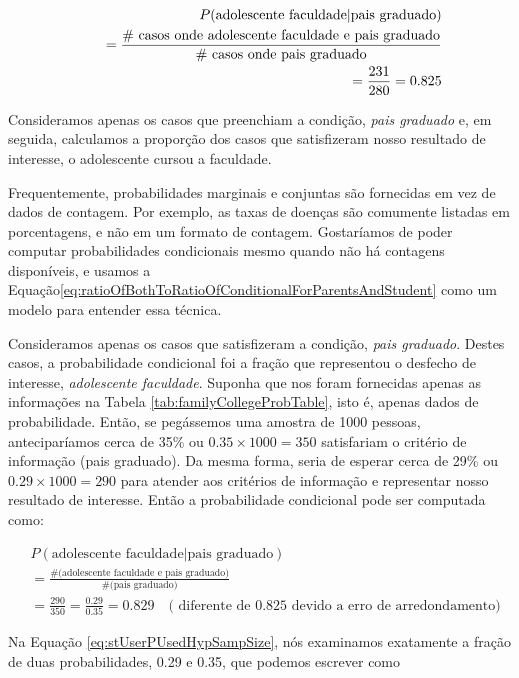 \documentclass[
]{book}
\theoremstyle{definition}
\theoremstyle{definition}
\theoremstyle{definition}
\theoremstyle{definition}
\theoremstyle{remark}
\begin{document}
\begin{eqnarray}
&& P(\text{adolescente faculdade} | \text{pais graduado}) \\
&&\quad = \frac{\text{\# casos onde adolescente faculdade e pais graduado}}{\text{\# casos onde pais graduado}} \\
&&\quad = \frac{231}{280} = 0.825 \notag
\label{eq:ratioOfBothToRatioOfConditionalForParentsAndStudent}
\end{eqnarray}

Consideramos apenas os casos que preenchiam a condição, \emph{pais graduado} e, em seguida, calculamos a proporção dos casos que satisfizeram nosso resultado de interesse, o adolescente cursou a faculdade.

Frequentemente, probabilidades marginais e conjuntas são fornecidas em vez de dados de contagem. Por exemplo, as taxas de doenças são comumente listadas em porcentagens, e não em um formato de contagem. Gostaríamos de poder computar probabilidades condicionais mesmo quando não há contagens disponíveis, e usamos a Equação\eqref{eq:ratioOfBothToRatioOfConditionalForParentsAndStudent} como um modelo para entender essa técnica.

Consideramos apenas os casos que satisfizeram a condição, \emph{pais graduado}. Destes casos, a probabilidade condicional foi a fração que representou o desfecho de interesse, \emph{adolescente faculdade}. Suponha que nos foram fornecidas apenas as informações na Tabela \ref{tab:familyCollegeProbTable}, isto é, apenas dados de probabilidade. Então, se pegássemos uma amostra de 1000 pessoas, anteciparíamos cerca de 35\% ou \(0.35\times 1000 = 350\) satisfariam o critério de informação (pais graduado). Da mesma forma, seria de esperar cerca de 29\% ou \(0.29\times 1000 = 290\) para atender aos critérios de informação e representar nosso resultado de interesse. Então a probabilidade condicional pode ser computada como:

\begin{align}
&P(\text{adolescente faculdade} | \text{pais graduado})  \\
    &= \frac{\text{\# (adolescente faculdade e pais graduado)}}{\text{\# (pais graduado)}}  \\
    &= \frac{290}{350}
        = \frac{0.29}{0.35}
        = 0.829\quad\text{( diferente de 0.825 devido a erro de arredondamento)}
\label{eq:stUserPUsedHypSampSize}
\end{align}

Na Equação \eqref{eq:stUserPUsedHypSampSize}, nós examinamos exatamente a fração de duas probabilidades, 0.29 e 0.35, que podemos escrever como
\end{document}
